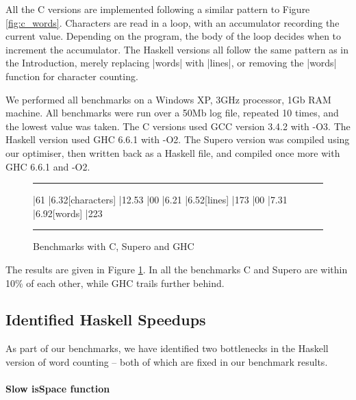\documentclass{llncs}
\newenvironment{fig}
    {\begin{figure}[tbp]\hrule}
    {\end{figure}}
\newcommand{\figend}{\hrule}
\begin{document}
All the C versions are implemented following a similar pattern to Figure \ref{fig:c_words}. Characters are read in a loop, with an accumulator recording the current value. Depending on the program, the body of the loop decides when to increment the accumulator. The Haskell versions all follow the same pattern as in the Introduction, merely replacing |words| with |lines|, or removing the |words| function for character counting.

We performed all benchmarks on a Windows XP, 3GHz processor, 1Gb RAM machine. All benchmarks were run over a 50Mb log file, repeated 10 times, and the lowest value was taken. The C versions used GCC \cite{gcc} version 3.4.2 with -O3. The Haskell version used GHC \cite{ghc} 6.6.1 with -O2. The Supero version was compiled using our optimiser, then written back as a Haskell file, and compiled once more with GHC 6.6.1 and -O2.

\begin{fig}
\vspace{7mm}
\begin{barenv}
 
\bar{6}{1}
\bar{6.3}{2}[characters]
\bar{12.5}{3}
\bar{0}{0}
\bar{6.2}{1}
\bar{6.5}{2}[lines]
\bar{17}{3}
\bar{0}{0}
\bar{7.3}{1}
\bar{6.9}{2}[words]
\bar{22}{3}
\end{barenv}
\vspace{7mm}
\figend
\caption{Benchmarks with C, Supero and GHC}
\label{fig:c_results}
\end{fig}

The results are given in Figure \ref{fig:c_results}. In all the benchmarks C and Supero are within 10\% of each other, while GHC trails further behind.

\subsection{Identified Haskell Speedups}

As part of our benchmarks, we have identified two bottlenecks in the Haskell version of word counting -- both of which are fixed in our benchmark results.

\paragraph{Slow \textsf{isSpace} function}
 
\end{document}
